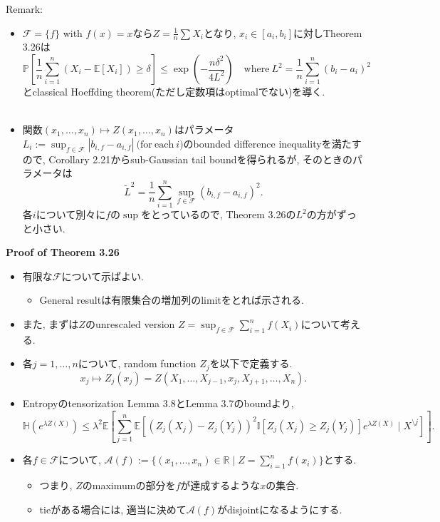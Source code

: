 \documentclass[aspectratio=169, dvipdfmx]{beamer}
\newcommand{\ex}{\mathbb{E}}
\newcommand{\bb}{\mathbb}
\newcommand{\cc}{\mathcal}
\begin{document}
\begin{frame}
    Remark:
    \begin{itemize}
        \item $\cc{F} = \{f\}$ with $f(x) = x$なら$Z = \frac{1}{n}\sum X_i$となり,
        $x_i \in [a_i, b_i]$に対しTheorem 3.26は
        \[
            \bb{P} \left[\frac{1}{n}\sum_{i=1}^n (X_i - \ex[X_i]) \ge \delta\right]
            \le \exp\left(-\frac{n\delta^2}{4L^2}\right)
            \quad \mathrm{where\ } L^2 = \frac{1}{n}\sum_{i=1}^n (b_i-a_i)^2
        \]
        とclassical Hoeffding theorem(ただし定数項はoptimalでない)を導く.\\
        　
        \item 関数$(x_1, \dots, x_n) \mapsto Z(x_1,\dots,x_n)$はパラメータ$L_i := \sup_{f \in \cc{F}}|b_{i,f}-a_{i,f}|\ \mathrm{(for\ each\ } i\mathrm{)}$のbounded difference inequalityを満たすので,
        Corollary 2.21からsub-Gaussian tail boundを得られるが, そのときのパラメータは
        \[
            \tilde{L}^2 
            = \frac{1}{n}\sum_{i=1}^n \sup_{f \in \cc{F}} (b_{i,f} - a_{i,f})^2.
        \]
        各$i$について別々に$f$の$\sup$をとっているので, Theorem 3.26の$L^2$の方がずっと小さい.
    \end{itemize}
\end{frame}

\begin{frame}{}{}
{\bf Proof of Theorem 3.26}
\begin{itemize}
    \item 有限な$\cc{F}$について示ばよい.
    \begin{itemize}
        \item General resultは有限集合の増加列のlimitをとれば示される.
    \end{itemize}
    \item また, まずは$Z$のunrescaled version $Z = \sup_{f \in \cc{F}} \sum_{i=1}^n f(X_i)$について考える.
    \item 各$j = 1,\dots,n$について, random function $Z_j$を以下で定義する.
    \[ x_j \mapsto Z_j(x_j) = Z(X_1,\dots,X_{j-1}, x_j, X_{j+1},\dots,X_n). \]
    \item Entropyのtensorization Lemma 3.8とLemma 3.7のboundより,
    \[
        \bb{H}(e^{\lambda Z(X)})
        \le \lambda^2 \ex\left[ \sum_{j=1}^n \ex\left[(Z_j(X_j)-Z_j(Y_j))^2\bb{I}[Z_j(X_j) \ge Z_j(Y_j)]e^{\lambda Z(X)} \mid X^{\setminus j}\right] \right].
        \tag{3.81}\label{3.81}
    \]
    \item 各$f \in \cc{F}$について,
    $\cc{A}(f) := \{(x_1,\dots,x_n)\in\bb{R}\mid Z = \sum_{i=1}^n f(x_i)\}$とする.
    \begin{itemize}
        \item つまり, $Z$のmaximumの部分を$f$が達成するような$x$の集合.
        \item tieがある場合には, 適当に決めて$\cc{A}(f)$がdisjointになるようにする.
    \end{itemize}
\end{itemize}
\end{frame}
\end{document}
